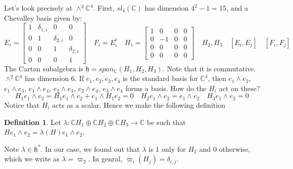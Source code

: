 \documentclass[11pt]{article}
\theoremstyle{definition}
\newtheorem{definition}{Definition}[section]
\theoremstyle{example}
\theoremstyle{remark}
\theoremstyle{lemma}
\theoremstyle{proposition}
\theoremstyle{Problem}
\theoremstyle{Solution}
\theoremstyle{theorem}
\theoremstyle{corollary}
\begin{document}
Let's look precisely at $\wedge^2\mathbb{C}^4$.
First, $sl_4(\mathbb{C})$ has dimension $4^2-1 = 15$, and a Chevalley basis given by:
$$E_i = \begin{bmatrix}
1 & \delta_{1,i} & 0 & 0\\
0 & 1 & \delta_{2,i} & 0\\
0 & 0 & 1 & \delta_{2,i}\\
0 & 0 & 0 & 1
\end{bmatrix}
\quad F_i = E_i^t
\quad H_1 =  \begin{bmatrix}
1 & 0 & 0 & 0\\
0 & -1 & 0 & 0\\
0 & 0 & 0 & 0\\
0 & 0 & 0 & 0
\end{bmatrix}
\quad H_2, H_3
\quad [E_i,E_j]
\quad [F_i,F_j]
$$
The Cartan subalgebra is $\mathfrak{h} = span_\mathbb{C} (H_1, H_2, H_3)$. Note that it is commutative.\\
$\wedge^2\mathbb{C}^4$ has dimension $6$. If $e_1,e_2,e_3,e_4$ is the standard basis for $\mathbb{C}^4$, then $e_1\wedge e_2$, $e_1\wedge e_3$, $e_1\wedge e_4$, $e_2\wedge e_3$, $e_2\wedge e_4$, $e_3\wedge e_4$ forms a basis. How do the $H_i$ act on these?
$$H_1 e_1\wedge e_2 = H_1 e_1 \wedge e_2 + e_1 \wedge H_1 e_2 = 0
\quad H_2 e_1 \wedge e_2 = e_1\wedge e_2
\quad H_3 e_1\wedge e_2 = 0$$
Notice that $H_i$ acts as a scalar. Hence we make the following definition
\begin{definition}
Let $\lambda:\mathbb{C}H_1\oplus\mathbb{C}H_2\oplus \mathbb{C}H_3 \to \mathbb{C}$ be such that $H e_1\wedge e_2 = \lambda(H) e_1\wedge e_2$.
\end{definition}
Note $\lambda \in \mathfrak{h}^*$. In our case, we found out that $\lambda$ is 1 only for $H_2$ and 0 otherwise, which we write as $\lambda = \varpi_2$. In genral, $\varpi_i(H_j) = \delta_{i,j}$.
\end{document}
